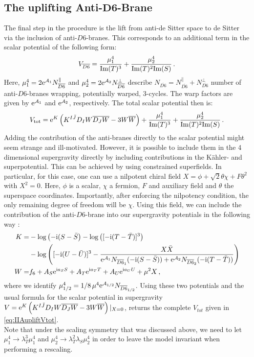 \documentclass[a4paper,12pt,twoside,openright]{report}
\newcommand{\be}{\begin{equation}}
\newcommand{\ee}{\end{equation}}
\newcommand{\bea}{\begin{equation}\begin{aligned}}
\newcommand{\eea}{\end{aligned}\end{equation}}
\def\rmi{{\rm i}}
\def\rme{{\rm e}}
\def\rmim{{\rm Im}}
\begin{document}
\subsection[The uplifting Anti-$D6$-Brane]{The uplifting Anti-$\mathbf{D6}$-Brane}
The final step in the procedure is the lift from anti-de Sitter space to de Sitter via the inclusion of anti-$D6$-branes. This corresponds to an additional term in the scalar potential of the following form:
\be 
V_{\overline{D6}} = \frac{\mu_1^4}{\rmim (T)^3} + \frac{\mu_2^4}{\rmim(T)^2\rmim(S)}\,.
\ee
Here, $\mu_1^4 = 2 \rme^{\mathcal{A}_1} N_{\overline{D6}}^\parallel$ and $\mu_2^4 = 2 \rme^{\mathcal{A}_2} N_{\overline{D6}}^\perp$ describe $N_{\overline{D6}} = N_{\overline{D6}}^\parallel + N_{\overline{D6}}^\perp$ number of anti-$D6$-branes wrapping, potentially warped, 3-cycles. The warp factors are given by $\rme^{\mathcal{A}_1}$ and $\rme^{\mathcal{A}_2}$, respectively. The total scalar potential then is:
\be 
V_{\text{tot}} = \rme^K \left( K^{I\bar{J}} D_{I}W \overline{D_{J} W} - 3 W \overline{W} \right) + \frac{\mu_1^4}{\rmim (T)^3} + \frac{\mu_2^4}{\rmim(T)^2\rmim(S)}\,.
\label{eq:IIAupliftVtot}
\ee
Adding the contribution of the anti-branes directly to the scalar potential might seem strange and ill-motivated. However, it is possible to include them in the 4 dimensional supergravity directly by including contributions in the Kähler- and superpotential. This can be achieved by using constrained superfields. In particular, for this case, one can use a nilpotent chiral field $X = \phi + \sqrt{2} \theta \chi + F \theta^2$ with $X^2=0$. Here, $\phi$ is a scalar, $\chi$ a fermion, $F$ and auxiliary field and $\theta$ the superspace coordinates. Importantly, after enforcing the nilpotency condition, the only remaining degree of freedom will be $\chi$. Using this field, we can include the contribution of the anti-$D6$-brane into our supergravity potentials in the following way \cite{Kallosh:2018nrk}:
\bea 
K = &- \log \left( -\rmi(S-\bar{S}\right) -  \log \left( [-\rmi (T-\bar{T})]^3\right) \\&- \log \left( [-\rmi(U-\bar{U})]^3 - \frac{X \bar{X}}{\rme^{\mathcal{A}_1} N_{\overline{D6}_1} (-\rmi (S-\bar{S})) +\rme^{\mathcal{A}_2} N_{\overline{D6}_2} (-\rmi (T-\bar{T}))}\right)\\
W = &f_6 + A_S \rme^{\rmi a_S S}+ A_T \rme^{\rmi a_T T}+ A_U \rme^{\rmi a_U U} + \mu^2 X\,,
\eea 
where we identify $\mu^4_{1/2} = 1/8\,\mu^4 \rme^{\mathcal{A}_{1/2}} N_{\overline{D6}_{1/2}}$.
Using these two potentials and the usual formula for the scalar potential in supergravity $V = \rme^K \left( K^{I\bar{J}} D_{I}W \overline{D_{J} W} - 3 W \overline{W} \right)|_{X=0}$, returns the complete $V_{tot}$ given in \eqref{eq:IIAupliftVtot}. \\
Note that under the scaling symmetry that was discussed above, we need to let $ \mu_1^4 \to \lambda_T^3 \mu_1^4 $ and $\mu_2^4 \to \lambda_T^2 \lambda_S\mu_2^4 $ in order to leave the model invariant when performing a rescaling.
\end{document}
